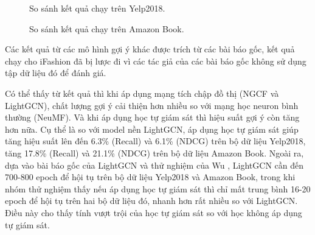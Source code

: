 \begin{figure}[H]
    \centering
    \hspace*{-10mm}
    
    \caption{So sánh kết quả chạy trên Yelp2018.}
\end{figure}

\begin{figure}[H]
    \centering
    \hspace*{-10mm}
    
    \caption{So sánh kết quả chạy trên Amazon Book.}
\end{figure}

Các kết quả từ các mô hình gợi ý khác được trích từ các bài báo gốc, kết quả chạy cho iFashion đã bị lược đi vì các tác giả của các bài báo gốc không sử dụng tập dữ liệu đó để đánh giá.

Có thể thấy từ kết quả thì khi áp dụng mạng tích chập đồ thị (NGCF và LightGCN), chất lượng gợi ý cải thiện hơn nhiều so với mạng học neuron bình thường (NeuMF). Và khi áp dụng học tự giám sát thì hiệu suất gợi ý còn tăng hơn nữa. Cụ thể là so với model nền LightGCN, áp dụng học tự giám sát giúp tăng hiệu suất lên đến 6.3\% (Recall) và 6.1\% (NDCG) trên bộ dữ liệu Yelp2018, tăng 17.8\% (Recall) và 21.1\% (NDCG) trên bộ dữ liệu Amazon Book. Ngoài ra, dựa vào bài báo gốc của LightGCN \cite{LightGCN} và thử nghiệm của Wu \cite{SGL}, LightGCN cần đến 700-800 epoch để hội tụ trên bộ dữ liệu Yelp2018 và Amazon Book, trong khi nhóm thử nghiệm thấy nếu áp dụng học tự giám sát thì chỉ mất trung bình 16-20 epoch để hội tụ trên hai bộ dữ liệu đó, nhanh hơn rất nhiều so với LightGCN. Điều này cho thấy tính vượt trội của học tự giám sát so với học không áp dụng tự giám sát.

